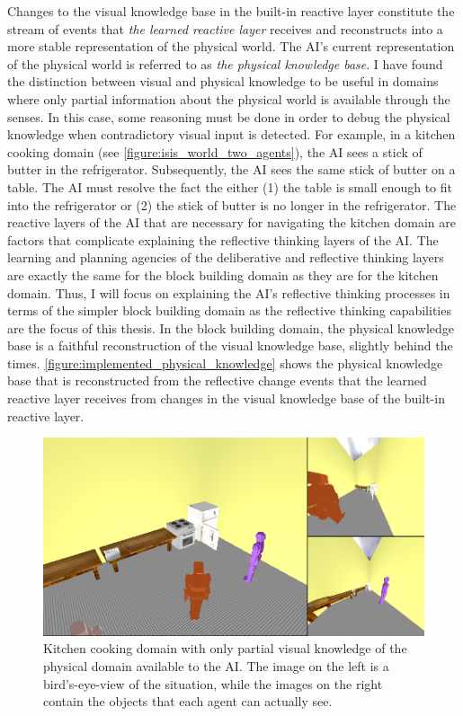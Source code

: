 Changes to the visual knowledge base in the built-in reactive layer
constitute the stream of events that \emph{the learned reactive layer}
receives and reconstructs into a more stable representation of the
physical world.  The AI's current representation of the physical world
is referred to as \emph{the physical knowledge base}.  I have found
the distinction between visual and physical knowledge to be useful in
domains where only partial information about the physical world is
available through the senses.  In this case, some reasoning must be
done in order to debug the physical knowledge when contradictory
visual input is detected.  For example, in a kitchen cooking domain
(see {\mbox{\autoref{figure:isis_world_two_agents}}}), the AI sees a
stick of butter in the refrigerator.  Subsequently, the AI sees the
same stick of butter on a table.  The AI must resolve the fact the
either (1) the table is small enough to fit into the refrigerator or
(2) the stick of butter is no longer in the refrigerator.  The
reactive layers of the AI that are necessary for navigating the
kitchen domain are factors that complicate explaining the reflective
thinking layers of the AI.  The learning and planning agencies of the
deliberative and reflective thinking layers are exactly the same for
the block building domain as they are for the kitchen domain.  Thus, I
will focus on explaining the AI's reflective thinking processes in
terms of the simpler block building domain as the reflective thinking
capabilities are the focus of this thesis.  In the block building
domain, the physical knowledge base is a faithful reconstruction of
the visual knowledge base, slightly behind the times.
{\mbox{\autoref{figure:implemented_physical_knowledge}}} shows the
physical knowledge base that is reconstructed from the reflective
change events that the learned reactive layer receives from changes in
the visual knowledge base of the built-in reactive layer.
\begin{figure}
\begin{center}
\includegraphics[width=12cm]{gfx/isis_world_two_agents}
\end{center}
\caption[Kitchen cooking domain with partial visual knowledge of the
  physical domain.]{Kitchen cooking domain with only partial visual
  knowledge of the physical domain available to the AI.  The image on
  the left is a bird's-eye-view of the situation, while the images on
  the right contain the objects that each agent can actually see.}
\label{figure:isis_world_two_agents}
\end{figure}
